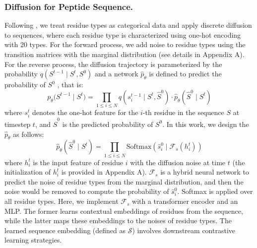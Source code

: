 \documentclass[letterpaper]{article} %
\begin{document}
\subsubsection{Diffusion for Peptide Sequence.}
Following \citet{anandProteinStructure2022}, we treat residue types as categorical data and apply discrete diffusion to sequences, where each residue type is characterized using one-hot encoding with 20 types. For the forward process, we add noise to residue types using the transition matrices with the marginal distribution \cite{austinStructuredDenoising2021, vignacDiGressDiscrete2023} (see details in Appendix A). For the reverse process, the diffusion trajectory is parameterized by the probability $q(S^{t-1}\mid S^t,S^0)$ and a network ${\hat{p}}_\theta$ is defined to predict the probability of $S^0$ \cite{austinStructuredDenoising2021}, that is:
\begin{equation}
p_\theta\big(S^{t-1}\mid S^t\big)=\prod_{1\leq i\leq N}q(s_i^{t-1}\mid S^t,\hat{S}^0)\cdot\hat{p}_\theta(\hat{S}^0\mid S^t)
\end{equation}
where $s_i^t$ denotes the one-hot feature for the $i$-th residue in the sequence $S$ at timestep $t$, and $\hat{S}^0$ is the predicted probability of $S^0$. In this work, we design the ${\hat{p}}_\theta$ as follows:
\begin{equation}
\hat{p}_{\theta}\left(\hat{S}^{0}\mid S^{t}\right)=\prod_{1\leq i\leq N}\text{Softmax}\left(\hat{s}_{i}^{0}\mid \mathcal{F}_s\left(h_{i}^{t}\right)\right)
\end{equation}
where $h_{i}^t$ is the input feature of residue $i$ with the diffusion noise at time $t$ (the initialization of $h_{i}^t$ is provided in Appendix A). $\mathcal{F}_s$ is a hybrid neural network to predict the noise of residue types from the marginal distribution, and then the noise would be removed to compute the probability of $\hat{s}_i^0$. Softmax is applied over all residue types. Here, we implement $\mathcal{F}_s$ with a transformer encoder and an MLP. The former learns contextual embeddings of residues from the sequence, while the latter maps these embeddings to the noises of residue types. The learned sequence embedding (defined as $\mathcal{S}$) involves downstream contrastive learning strategies.
\end{document}
